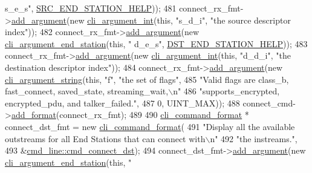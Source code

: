 \begin{DoxyCode}
{      s\_e\_s"}, \hyperlink{cmd__line_8cpp_a74df33715dde99b760d515a90f164e1e}{SRC\_END\_STATION\_HELP}));
481     connect\_rx\_fmt->\hyperlink{classcli__command__format_ac3fc6d13a227c195d5ee6f7b78eba9cd}{add\_argument}(\textcolor{keyword}{new} \hyperlink{classcli__argument__int}{cli\_argument\_int}(\textcolor{keyword}{this}, \textcolor{stringliteral}{"s\_d\_i"}, \textcolor{stringliteral}{"the
       source descriptor index"}));
482     connect\_rx\_fmt->\hyperlink{classcli__command__format_ac3fc6d13a227c195d5ee6f7b78eba9cd}{add\_argument}(\textcolor{keyword}{new} \hyperlink{classcli__argument__end__station}{cli\_argument\_end\_station}(\textcolor{keyword}{this}, \textcolor{stringliteral}{"
      d\_e\_s"}, \hyperlink{cmd__line_8cpp_a98040c43d21908ec69faa420184085bd}{DST\_END\_STATION\_HELP}));
483     connect\_rx\_fmt->\hyperlink{classcli__command__format_ac3fc6d13a227c195d5ee6f7b78eba9cd}{add\_argument}(\textcolor{keyword}{new} \hyperlink{classcli__argument__int}{cli\_argument\_int}(\textcolor{keyword}{this}, \textcolor{stringliteral}{"d\_d\_i"}, \textcolor{stringliteral}{"the
       destination descriptor index"}));
484     connect\_rx\_fmt->\hyperlink{classcli__command__format_ac3fc6d13a227c195d5ee6f7b78eba9cd}{add\_argument}(\textcolor{keyword}{new} \hyperlink{classcli__argument__string}{cli\_argument\_string}(\textcolor{keyword}{this}, \textcolor{stringliteral}{"f"}, \textcolor{stringliteral}{"the set
       of flags"},
485                                                          \textcolor{stringliteral}{"Valid flags are class\_b, fast\_connect,
       saved\_state, streaming\_wait,\(\backslash\)n"}
486                                                          \textcolor{stringliteral}{"supports\_encrypted, encrypted\_pdu, and
       talker\_failed."},
487                                                          0, UINT\_MAX));
488     connect\_cmd->\hyperlink{classcli__command_aa9ec38e761644d946f8db2b920e39921}{add\_format}(connect\_rx\_fmt);
489 
490     \hyperlink{classcli__command__format}{cli\_command\_format} * connect\_dst\_fmt = \textcolor{keyword}{new} 
      \hyperlink{classcli__command__format}{cli\_command\_format}(
491         \textcolor{stringliteral}{"Display all the available outstreams for all End Stations that can connect with\(\backslash\)n"}
492         \textcolor{stringliteral}{"the instreams."},
493         &\hyperlink{classcmd__line_ad7dd82af67a144efd5aa3330d888d04c}{cmd\_line::cmd\_connect\_dst});
494     connect\_dst\_fmt->\hyperlink{classcli__command__format_ac3fc6d13a227c195d5ee6f7b78eba9cd}{add\_argument}(\textcolor{keyword}{new} \hyperlink{classcli__argument__end__station}{cli\_argument\_end\_station}(\textcolor{keyword}{this}, \textcolor{stringliteral}{"
}
\end{DoxyCode}
